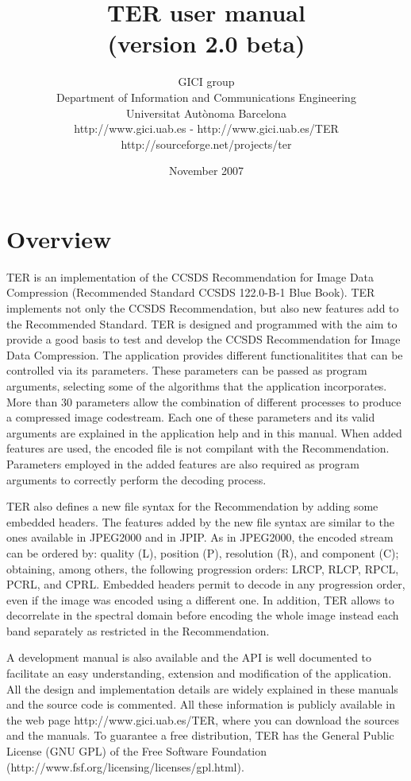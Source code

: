 \documentclass[a4paper,10pt]{article}
\title{TER user manual \\ \small (version 2.0 beta)}
\author{
GICI group \vspace{0.1cm} \\
\small Department of Information and Communications Engineering \\
\small Universitat Aut{\`o}noma Barcelona \\
\small http://www.gici.uab.es  -  http://www.gici.uab.es/TER \\
\small  http://sourceforge.net/projects/ter \\
}
\date{November 2007}
\begin{document}
\maketitle


\section{Overview}
\label{sect:overview}

	
TER is an implementation of the CCSDS Recommendation for Image Data
Compression (Recommended Standard CCSDS 122.0-B-1 Blue Book). TER
implements not only the CCSDS Recommendation, but also new features
add to the Recommended Standard. TER is designed and programmed with
the aim to provide a good basis to test and develop the CCSDS
Recommendation for Image Data Compression. The application provides
different functionalitites that can be controlled via its
parameters. These parameters can be passed as program arguments,
selecting some of the algorithms that the application
incorporates. More than 30 parameters allow the combination of
different processes to produce a compressed image codestream. Each one
of these parameters and its valid arguments are explained in the
application help and in this manual. When added features are used, the
encoded file is not compilant with the Recommendation. Parameters employed in the added
features are also required as program arguments to correctly perform
the decoding process.

TER also defines a new file syntax for the Recommendation by adding
some embedded headers.
The features added by the new file syntax are similar to the ones
available in JPEG2000 and in JPIP.
As in JPEG2000, the encoded stream can be ordered by: quality (L),
position (P), resolution (R), and component (C);
obtaining, among others, the following progression orders: LRCP, RLCP,
RPCL, PCRL, and CPRL. Embedded headers permit to decode in any progression
order, even if the image was encoded using a different one. In addition,
TER allows to decorrelate in the spectral domain
before encoding the whole image instead each band separately
as restricted in the Recommendation.

A development manual is also available and the API is well documented
to facilitate an easy understanding, extension and modification of
the application. All the design and implementation details are widely
explained in these manuals and the source code is commented. All
these information is publicly available in the web page
http://www.gici.uab.es/TER, where you can download the sources and
the manuals. To guarantee a free distribution, TER has the General
Public License (GNU GPL) of the Free Software Foundation
(http://www.fsf.org/licensing/licenses/gpl.html).
\end{document}
